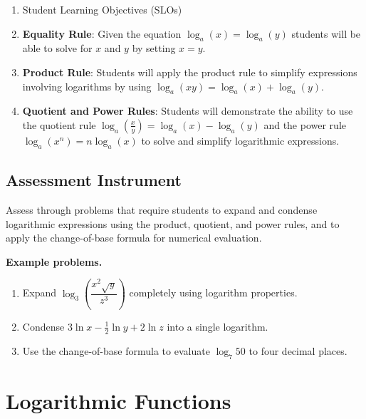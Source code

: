 \begin{enumerate}
    \item Student Learning Objectives (SLOs)
    \item \textbf{Equality Rule}: Given the equation $ \log_a(x) = \log_a(y) $ students will be able to solve for $x$ and $y$ by setting $ x = y. $
    \item \textbf{Product Rule}: Students will apply the product rule to simplify expressions involving logarithms by using $ \log_a(xy) = \log_a(x) + \log_a(y). $
    \item \textbf{Quotient and Power Rules}: Students will demonstrate the ability to use the quotient rule $ \log_a \left(\frac{x}{y}\right) = \log_a(x) - \log_a(y) $ and the power rule $ \log_a(x^n) = n \log_a(x) $ to solve and simplify logarithmic expressions.
\end{enumerate}

\subsection{Assessment Instrument}
\label{ssec:asse-812c}

Assess through problems that require students to expand and condense logarithmic
expressions using the product, quotient, and power rules, and to apply the change-of-base
formula for numerical evaluation.

\textbf{Example problems.}

\begin{enumerate}
    \item Expand $\log_3\!\left(\dfrac{x^2 \sqrt{y}}{z^3}\right)$ completely using logarithm properties.
    \item Condense $3\ln x - \tfrac{1}{2}\ln y + 2\ln z$ into a single logarithm.
    \item Use the change-of-base formula to evaluate $\log_7 50$ to four decimal places.
\end{enumerate}

\section{Logarithmic Functions}
\label{sec:loga-7d37}
